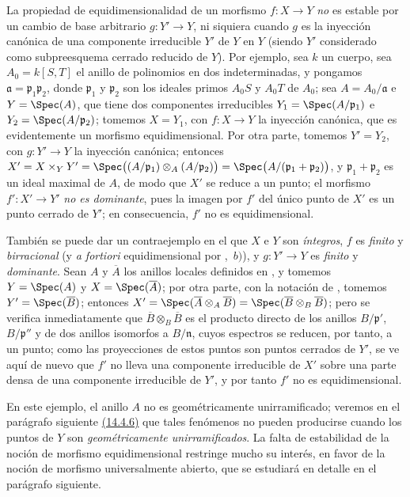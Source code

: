 \begin{remarks}[13.3.9]
\label{IV.13.3.9}
La propiedad de equidimensionalidad de un morfismo $f:X\to Y$ \emph{no} es estable por un cambio de base arbitrario $g:Y'\to Y$, ni siquiera cuando $g$ es la inyección canónica de una componente irreducible $Y'$ de $Y$ en $Y$ (siendo $Y'$
considerado como subpreesquema cerrado reducido de $Y$).
Por ejemplo, sea $k$ un cuerpo, sea $A_0=k[S,T]$ el anillo de polinomios en dos indeterminadas, y pongamos $\mathfrak{a}=\mathfrak{p}_1\mathfrak{p}_2$, donde $\mathfrak{p}_1$ y $\mathfrak{p}_2$ son los ideales primos $A_0S$ y $A_0T$ de $A_0$; sea $A=A_0/\mathfrak{a}$ e $Y=\Spec(A)$, que tiene dos componentes irreducibles $Y_1=\Spec(A/\mathfrak{p}_1)$ e $Y_2=\Spec(A/\mathfrak{p}_2)$; tomemos $X=Y_1$, con $f:X\to Y$ la inyección canónica, que es evidentemente un morfismo equidimensional.
Por otra parte, tomemos $Y'=Y_2$, con $g:Y'\to Y$ la inyección canónica; entonces $X'=X\times_Y Y'=\Spec\bigl((A/\mathfrak{p}_1)\otimes_A(A/\mathfrak{p}_2)\bigr)=\Spec\bigl(A/(\mathfrak{p}_1+\mathfrak{p}_2)\bigr)$, y $\mathfrak{p}_1+\mathfrak{p}_2$ es un ideal maximal de $A$, de modo que $X'$ se reduce a un punto; el morfismo $f':X'\to Y'$ \emph{no es dominante}, pues la imagen por $f'$ del único punto de $X'$ es un punto cerrado de $Y'$; en consecuencia, $f'$ no es equidimensional.

También se puede dar un contraejemplo en el que $X$ e $Y$ son \emph{íntegros}, $f$ es \emph{finito} y \emph{birracional} (y \emph{a fortiori} equidimensional por ,~$b)$), y $g:Y'\to Y$ es \emph{finito} y \emph{dominante}.
Sean $A$ y $\overline{A}$ los anillos locales definidos en , y tomemos $Y=\Spec(A)$ y $X=\Spec(\overline{A})$; por otra parte, con la notación de , tomemos $Y'=\Spec(\overline{B})$; entonces $X'=\Spec(\overline{A}\otimes_A\overline{B})=\Spec(\overline{B}\otimes_B\overline{B})$; pero se verifica inmediatamente que $\overline{B}\otimes_B\overline{B}$ es el producto directo de los anillos $B/\mathfrak{p}'$, $B/\mathfrak{p}''$ y de dos anillos isomorfos a $B/\mathfrak{n}$, cuyos espectros se reducen, por tanto, a un punto; como las proyecciones de estos puntos son puntos cerrados de $Y'$, se ve aquí de nuevo que $f'$ no lleva una componente irreducible de $X'$ sobre una parte densa de una componente irreducible de $Y'$, y por tanto $f'$ no es equidimensional.

En este ejemplo, el anillo $A$ no es geométricamente unirramificado; veremos en el parágrafo siguiente {\hyperlink{ega4.c04.cor.14-4-6}{(14.4.6)}} que tales fenómenos no pueden producirse cuando los puntos de $Y$ son \emph{geométricamente unirramificados}.
La falta de estabilidad de la noción de morfismo equidimensional restringe mucho su interés, en favor de la noción de morfismo universalmente abierto, que se estudiará en detalle en el parágrafo siguiente.
\end{remarks}
